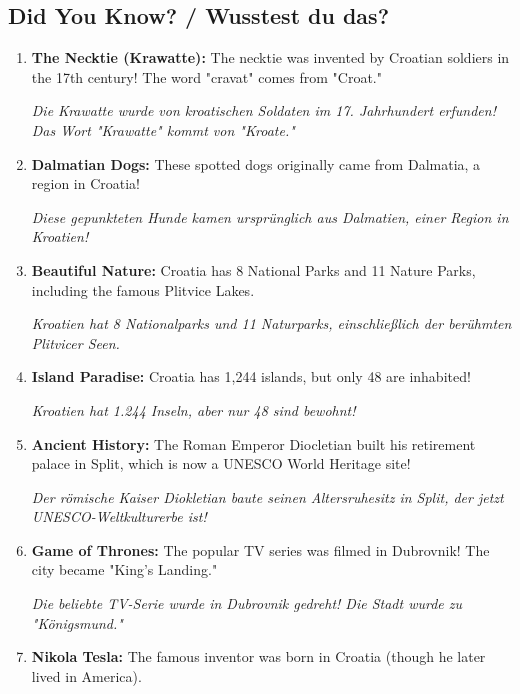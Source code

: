\begin{culture}
\subsection*{Did You Know? / Wusstest du das?}

\begin{enumerate}
    \item \textbf{The Necktie (Krawatte):} The necktie was invented by Croatian soldiers in the 17th century! The word "cravat" comes from "Croat."
    
    \textit{Die Krawatte wurde von kroatischen Soldaten im 17. Jahrhundert erfunden! Das Wort "Krawatte" kommt von "Kroate."}
    
    \item \textbf{Dalmatian Dogs:} These spotted dogs originally came from Dalmatia, a region in Croatia!
    
    \textit{Diese gepunkteten Hunde kamen ursprünglich aus Dalmatien, einer Region in Kroatien!}
    
    \item \textbf{Beautiful Nature:} Croatia has 8 National Parks and 11 Nature Parks, including the famous Plitvice Lakes.
    
    \textit{Kroatien hat 8 Nationalparks und 11 Naturparks, einschließlich der berühmten Plitvicer Seen.}
    
    \item \textbf{Island Paradise:} Croatia has 1,244 islands, but only 48 are inhabited!
    
    \textit{Kroatien hat 1.244 Inseln, aber nur 48 sind bewohnt!}
    
    \item \textbf{Ancient History:} The Roman Emperor Diocletian built his retirement palace in Split, which is now a UNESCO World Heritage site!
    
    \textit{Der römische Kaiser Diokletian baute seinen Altersruhesitz in Split, der jetzt UNESCO-Weltkulturerbe ist!}
    
    \item \textbf{Game of Thrones:} The popular TV series was filmed in Dubrovnik! The city became "King's Landing."
    
    \textit{Die beliebte TV-Serie wurde in Dubrovnik gedreht! Die Stadt wurde zu "Königsmund."}
    
    \item \textbf{Nikola Tesla:} The famous inventor was born in Croatia (though he later lived in America).
    

\end{enumerate}
\end{culture}
